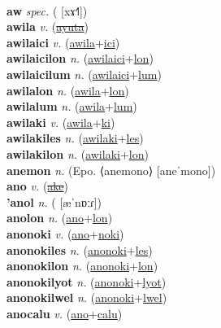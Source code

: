  \label{alkun} \\
\textbf{aw} \textit{spec.} ( [xɤ˧˥])
 \label{aw} \\
\textbf{awila} \textit{v.} (\hyperref[ayuta]{\sout{ayuta}})
 \label{awila} \\
\textbf{awilaici} \textit{v.} (\hyperref[awila]{awila}+\hyperref[ici]{ici})
 \label{awilaici} \\
\textbf{awilaicilon} \textit{n.} (\hyperref[awilaici]{awilaici}+\hyperref[lon]{lon})
 \label{awilaicilon} \\
\textbf{awilaicilum} \textit{n.} (\hyperref[awilaici]{awilaici}+\hyperref[lum]{lum})
 \label{awilaicilum} \\
\textbf{awilalon} \textit{n.} (\hyperref[awila]{awila}+\hyperref[lon]{lon})
 \label{awilalon} \\
\textbf{awilalum} \textit{n.} (\hyperref[awila]{awila}+\hyperref[lum]{lum})
 \label{awilalum} \\
\textbf{awilaki} \textit{v.} (\hyperref[awila]{awila}+\hyperref[ki]{ki})
 \label{awilaki} \\
\textbf{awilakiles} \textit{n.} (\hyperref[awilaki]{awilaki}+\hyperref[les]{les})
 \label{awilakiles} \\
\textbf{awilakilon} \textit{n.} (\hyperref[awilaki]{awilaki}+\hyperref[lon]{lon})
 \label{awilakilon} \\
\textbf{anemon} \textit{n.} (Epo. ⟨anemono⟩ [aneˈmono])
 \label{anemon} \\
\textbf{ano} \textit{v.} (\hyperref[ake]{\sout{ake}})
 \label{ano} \\
\textbf{'anol} \textit{n.} ( [æˈnɒːɾ])
 \label{'anol} \\
\textbf{anolon} \textit{n.} (\hyperref[ano]{ano}+\hyperref[lon]{lon})
 \label{anolon} \\
\textbf{anonoki} \textit{v.} (\hyperref[ano]{ano}+\hyperref[noki]{noki})
 \label{anonoki} \\
\textbf{anonokiles} \textit{n.} (\hyperref[anonoki]{anonoki}+\hyperref[les]{les})
 \label{anonokiles} \\
\textbf{anonokilon} \textit{n.} (\hyperref[anonoki]{anonoki}+\hyperref[lon]{lon})
 \label{anonokilon} \\
\textbf{anonokilyot} \textit{n.} (\hyperref[anonoki]{anonoki}+\hyperref[lyot]{lyot})
 \label{anonokilyot} \\
\textbf{anonokilwel} \textit{n.} (\hyperref[anonoki]{anonoki}+\hyperref[lwel]{lwel})
 \label{anonokilwel} \\
\textbf{anocalu} \textit{v.} (\hyperref[ano]{ano}+\hyperref[calu]{calu})
